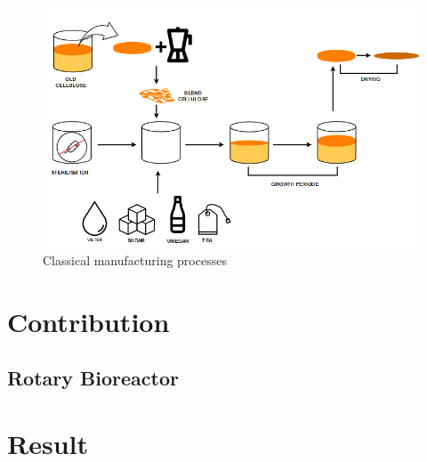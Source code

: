 \begin{figure}[h]
    \centering
    \includegraphics{images/SCOBY_diag.png}
    \caption{Classical manufacturing processes}
    \label{fig:}
\end{figure} 

\section{Contribution}

\subsection{Rotary Bioreactor}


\section{Result}

